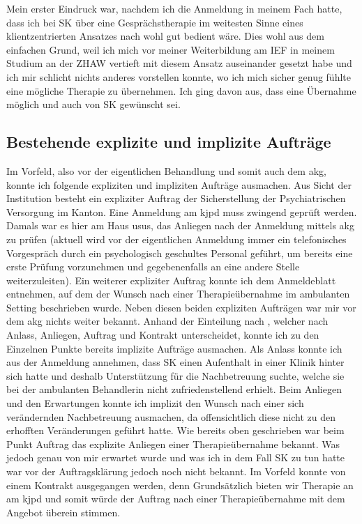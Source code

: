 Mein erster Eindruck war, nachdem ich die Anmeldung in meinem Fach hatte, dass ich bei SK über eine Gesprächstherapie im weitesten Sinne eines klientzentrierten Ansatzes nach  wohl gut bedient wäre. Dies wohl aus dem einfachen Grund, weil ich mich vor meiner Weiterbildung am IEF in meinem Studium an der ZHAW vertieft mit diesem Ansatz auseinander gesetzt habe und ich mir schlicht nichts anderes vorstellen konnte, wo ich mich sicher genug fühlte eine mögliche Therapie zu übernehmen. Ich ging  davon aus, dass eine Übernahme möglich und auch von SK gewünscht sei. 

\subsection{Bestehende explizite und implizite Aufträge} 
Im Vorfeld, also vor der eigentlichen Behandlung und somit auch dem \ac{akg}, konnte ich folgende expliziten und impliziten Aufträge ausmachen. Aus Sicht der Institution besteht ein expliziter Auftrag der Sicherstellung der Psychiatrischen Versorgung im Kanton. Eine Anmeldung am \ac{kjpd} muss zwingend geprüft werden. Damals war es hier am Haus usus, das Anliegen nach der Anmeldung mittels \ac{akg} zu prüfen (aktuell wird vor der eigentlichen Anmeldung immer ein telefonisches Vorgespräch durch ein psychologisch geschultes Personal geführt, um bereits eine erste Prüfung vorzunehmen und gegebenenfalls an eine andere Stelle weiterzuleiten). Ein weiterer expliziter Auftrag konnte ich dem Anmeldeblatt entnehmen, auf dem der Wunsch nach einer Therapieübernahme im ambulanten Setting beschrieben wurde. Neben diesen beiden expliziten Aufträgen war mir vor dem \ac{akg} nichts weiter bekannt. Anhand der Einteilung nach , welcher nach Anlass, Anliegen, Auftrag und Kontrakt unterscheidet, konnte ich zu den Einzelnen Punkte bereits implizite Aufträge ausmachen. Als Anlass konnte ich aus der Anmeldung annehmen, dass SK einen Aufenthalt in einer Klinik hinter sich hatte und deshalb Unterstützung für die Nachbetreuung suchte, welche sie bei der ambulanten Behandlerin nicht zufriedenstellend erhielt. Beim Anliegen und den Erwartungen konnte ich implizit den Wunsch nach einer sich verändernden Nachbetreuung ausmachen, da offensichtlich diese nicht zu den erhofften Veränderungen geführt hatte. Wie bereits oben geschrieben war beim Punkt Auftrag das explizite Anliegen einer Therapieübernahme bekannt. Was jedoch genau von mir erwartet wurde und was ich in dem Fall SK zu tun hatte war vor der Auftragsklärung jedoch noch nicht bekannt. Im Vorfeld konnte von einem Kontrakt ausgegangen werden, denn Grundsätzlich bieten wir Therapie an am \ac{kjpd} und somit würde der Auftrag nach einer Therapieübernahme mit dem Angebot überein stimmen.  

